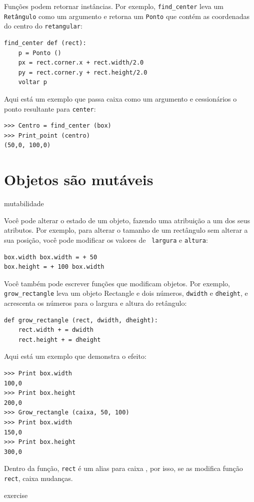 \documentclass[10pt]{book}
\begin{document}
\begin{exercise}
\begin{v erbatim}
{Funções podem retornar instâncias. Por exemplo, \verb "find_center"
leva um {\tt Retângulo} como um argumento e retorna um {\tt Ponto}
que contém as coordenadas do centro do {\tt retangular}:

\begin{verbatim}
find_center def (rect):
    p = Ponto ()
    px = rect.corner.x + rect.width/2.0
    py = rect.corner.y + rect.height/2.0
    voltar p
\end{verbatim}
%
Aqui está um exemplo que passa {caixa \tt} como um argumento e cessionários
o ponto resultante para {\tt center}:

\begin{verbatim}
>>> Centro = find_center (box)
>>> Print_point (centro)
(50,0, 100,0)
\end{verbatim}
%

\section{Objetos são mutáveis}
\index{} mutabilidade

Você pode alterar o estado de um objeto, fazendo uma atribuição a um dos
seus atributos. Por exemplo, para alterar o tamanho de um rectângulo
sem alterar a sua posição, você pode modificar os valores de {\tt
largura} e {\tt altura}:

\begin{verbatim}
box.width box.width = + 50
box.height = + 100 box.width
\end{verbatim}
%
Você também pode escrever funções que modificam objetos. Por exemplo,
\Verb "grow_rectangle" leva um objeto Rectangle e dois números,
{\tt dwidth} e {\tt dheight}, e acrescenta os números para o
largura e altura do retângulo:

\begin{verbatim}
def grow_rectangle (rect, dwidth, dheight):
    rect.width + = dwidth
    rect.height + = dheight
\end{verbatim}
%
Aqui está um exemplo que demonstra o efeito:

\begin{verbatim}
>>> Print box.width
100,0
>>> Print box.height
200,0
>>> Grow_rectangle (caixa, 50, 100)
>>> Print box.width
150,0
>>> Print box.height
300,0
\end{verbatim}
%
Dentro da função, {\tt rect} é um
alias para {caixa \tt}, por isso, se as modifica função {\tt rect}, 
{caixa \tt} mudanças.

\begin{} exercise


\end{}}
\end{v erbatim}
\end{exercise}
\end{document}
